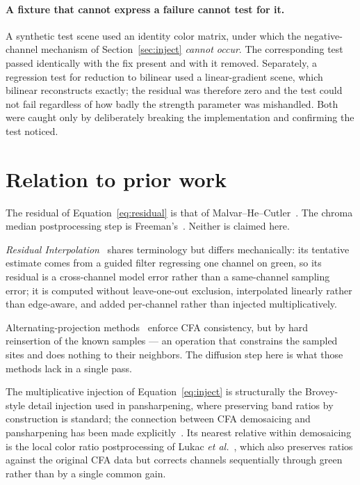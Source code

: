 \documentclass[10pt,a4paper]{article}
\begin{document}
\paragraph{A fixture that cannot express a failure cannot test for it.} A
synthetic test scene used an identity color matrix, under which the
negative-channel mechanism of Section~\ref{sec:inject} \emph{cannot occur}. The
corresponding test passed identically with the fix present and with it removed.
Separately, a regression test for reduction to bilinear used a linear-gradient
scene, which bilinear reconstructs exactly; the residual was therefore zero and
the test could not fail regardless of how badly the strength parameter was
mishandled. Both were caught only by deliberately breaking the implementation
and confirming the test noticed.

\section{Relation to prior work}
\label{sec:priorwork}

The residual of Equation~\ref{eq:residual} is that of
Malvar--He--Cutler~\cite{malvar2004}. The chroma median postprocessing step is
Freeman's~\cite{freeman1988patent}. Neither is claimed here.

\emph{Residual Interpolation}~\cite{kiku2013,monno2017} shares terminology but
differs mechanically: its tentative estimate comes from a guided filter
regressing one channel on green, so its residual is a cross-channel model error
rather than a same-channel sampling error; it is computed without leave-one-out
exclusion, interpolated linearly rather than edge-aware, and added
per-channel rather than injected multiplicatively.

Alternating-projection methods~\cite{gunturk2002} enforce CFA consistency, but
by hard reinsertion of the known samples --- an operation that constrains the
sampled sites and does nothing to their neighbors. The diffusion step here is
what those methods lack in a single pass.

The multiplicative injection of Equation~\ref{eq:inject} is structurally the
Brovey-style detail injection used in pansharpening, where preserving band
ratios by construction is standard; the connection between CFA demosaicing and
pansharpening has been made explicitly~\cite{vivone2017}. Its nearest relative
within demosaicing is the local color ratio postprocessing of Lukac
\emph{et al.}~\cite{lukac2004}, which also preserves ratios against the
original CFA data but corrects channels sequentially through green rather than
by a single common gain.
\end{document}
